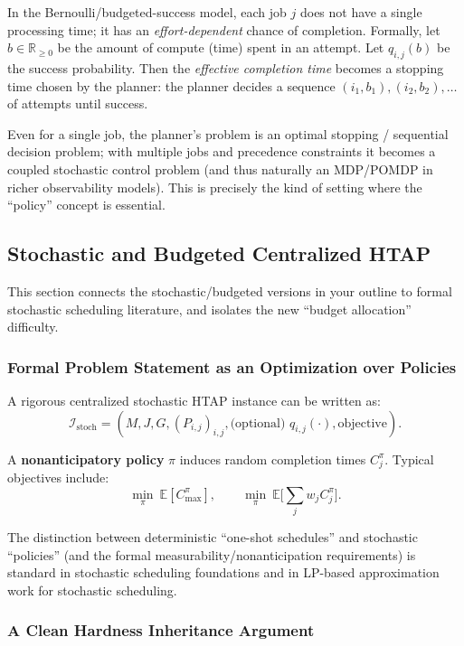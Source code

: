 In the Bernoulli/budgeted-success model, each job \(j\) does not have a single processing time; it has an \emph{effort-dependent} chance of completion. Formally, let \(b\in \mathbb{R}_{\ge 0}\) be the amount of compute (time) spent in an attempt. Let \(q_{i,j}(b)\) be the success probability. Then the \emph{effective completion time} becomes a stopping time chosen by the planner: the planner decides a sequence \((i_1,b_1),(i_2,b_2),\dots\) of attempts until success.

Even for a single job, the planner's problem is an optimal stopping / sequential decision problem; with multiple jobs and precedence constraints it becomes a coupled stochastic control problem (and thus naturally an MDP/POMDP in richer observability models). This is precisely the kind of setting where the ``policy'' concept is essential.

\subsection{Stochastic and Budgeted Centralized HTAP}

This section connects the stochastic/budgeted versions in your outline to formal stochastic scheduling literature, and isolates the new ``budget allocation'' difficulty.

\subsubsection{Formal Problem Statement as an Optimization over Policies}

A rigorous centralized stochastic HTAP instance can be written as:
\[
\mathcal{I}_{\mathrm{stoch}}=(M,J,G,(P_{i,j})_{i,j},\text{(optional) }q_{i,j}(\cdot),\text{objective}).
\]

A \textbf{nonanticipatory policy} \(\pi\) induces random completion times \(C_j^\pi\). Typical objectives include:
\[
\min_\pi\ \mathbb{E}[C_{\max}^\pi],
\qquad
\min_\pi\ \mathbb{E}\Big[\sum_j w_j C_j^\pi\Big].
\]

The distinction between deterministic ``one-shot schedules'' and stochastic ``policies'' (and the formal measurability/nonanticipation requirements) is standard in stochastic scheduling foundations and in LP-based approximation work for stochastic scheduling.

\subsubsection{A Clean Hardness Inheritance Argument}


